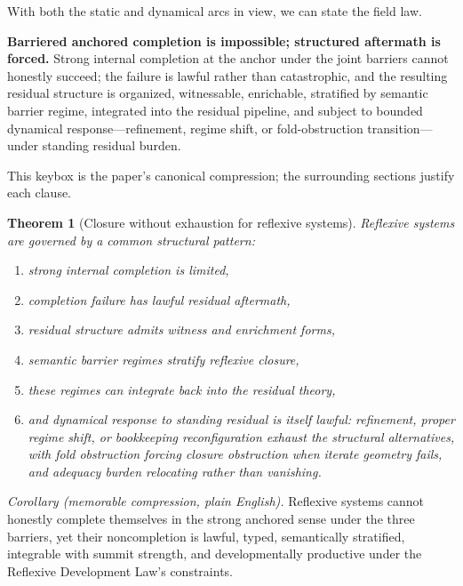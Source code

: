 \documentclass[11pt]{article}
\theoremstyle{plain}
\newtheorem{theorem}{Theorem}[section]
\theoremstyle{definition}
\theoremstyle{remark}
\begin{document}
With both the static and dynamical arcs in view, we can state the field law.

\begin{keybox}[title=Master law of reflexive systems (canonical formulation)]
\textbf{Barriered anchored completion is impossible; structured aftermath is forced.} Strong internal completion at the anchor under the joint barriers cannot honestly succeed; the failure is lawful rather than catastrophic, and the resulting residual structure is organized, witnessable, enrichable, stratified by semantic barrier regime, integrated into the residual pipeline, and subject to bounded dynamical response---refinement, regime shift, or fold-obstruction transition---under standing residual burden.
\end{keybox}

This keybox is the paper's canonical compression; the surrounding sections justify each clause.

\begin{theorem}[Closure without exhaustion for reflexive systems]\label{theorem:general-law}
Reflexive systems are governed by a common structural pattern:
\begin{enumerate}[label=(\roman*)]
\item strong internal completion is limited,
\item completion failure has lawful residual aftermath,
\item residual structure admits witness and enrichment forms,
\item semantic barrier regimes stratify reflexive closure,
\item these regimes can integrate back into the residual theory,
\item and dynamical response to standing residual is itself lawful: refinement, proper regime shift, or bookkeeping reconfiguration exhaust the structural alternatives, with fold obstruction forcing closure obstruction when iterate geometry fails, and adequacy burden relocating rather than vanishing.
\end{enumerate}
\end{theorem}

\noindent\emph{Corollary (memorable compression, plain English).} Reflexive systems cannot honestly complete themselves in the strong anchored sense under the three barriers, yet their noncompletion is lawful, typed, semantically stratified, integrable with summit strength, and developmentally productive under the Reflexive Development Law's constraints.
\end{document}
